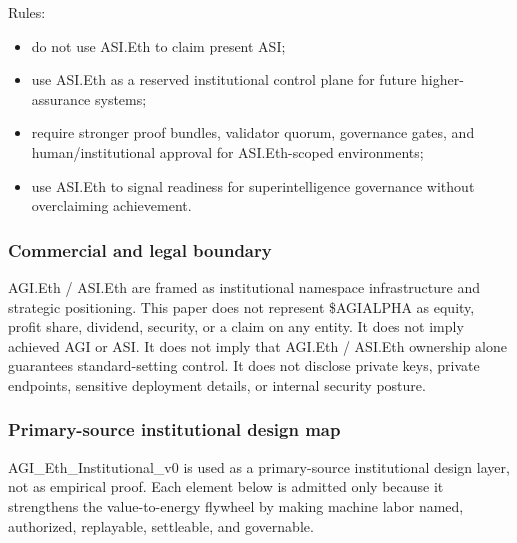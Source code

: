 Rules:

\begin{itemize}
\tightlist
\item
  do not use ASI.Eth to claim present ASI;
\item
  use ASI.Eth as a reserved institutional control plane for future
  higher-assurance systems;
\item
  require stronger proof bundles, validator quorum, governance gates,
  and human/institutional approval for ASI.Eth-scoped environments;
\item
  use ASI.Eth to signal readiness for superintelligence governance
  without overclaiming achievement.
\end{itemize}

\subsubsection{Commercial and legal
boundary}\label{commercial-and-legal-boundary}

AGI.Eth / ASI.Eth are framed as institutional namespace infrastructure
and strategic positioning. This paper does not represent \$AGIALPHA as
equity, profit share, dividend, security, or a claim on any entity. It
does not imply achieved AGI or ASI. It does not imply that AGI.Eth /
ASI.Eth ownership alone guarantees standard-setting control. It does not
disclose private keys, private endpoints, sensitive deployment details,
or internal security posture.

\subsubsection{Primary-source institutional design
map}\label{primary-source-institutional-design-map}

\begingroup\scriptsize

AGI\_Eth\_Institutional\_v0 is used as a primary-source institutional
design layer, not as empirical proof. Each element below is admitted
only because it strengthens the value-to-energy flywheel by making
machine labor named, authorized, replayable, settleable, and governable.


